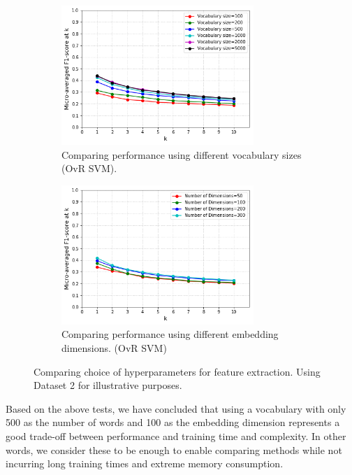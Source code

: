 \begin{figure}[H]
    \begin{subfigure}{0.5\textwidth}
        \centering
    \includegraphics[width=0.8\textwidth]{chapters/05_experiments/images/comparison-vocabulary-size.png}
    \caption{Comparing performance using different vocabulary sizes (OvR SVM).}
    \label{fig:vocabulary_size_comparison}
    \end{subfigure}
    \begin{subfigure}{0.5\textwidth}
        \centering
    \includegraphics[width=0.8\textwidth]{chapters/05_experiments/images/comparison-number-of-dimensions.png}
    \caption{Comparing performance using different embedding dimensions. (OvR SVM)}
    \label{fig:embedding_dimension_comparison}
    \end{subfigure}
    \caption{Comparing choice of hyperparameters for feature extraction. Using Dataset 2 for illustrative purposes.}
\end{figure}

Based on the above tests, we have concluded that using a vocabulary with only 500 as the number of words and 100 as the embedding dimension represents a good trade-off between performance and training time and complexity. In other words, we consider these to be enough to enable comparing methods while not incurring long training times and extreme memory consumption.

